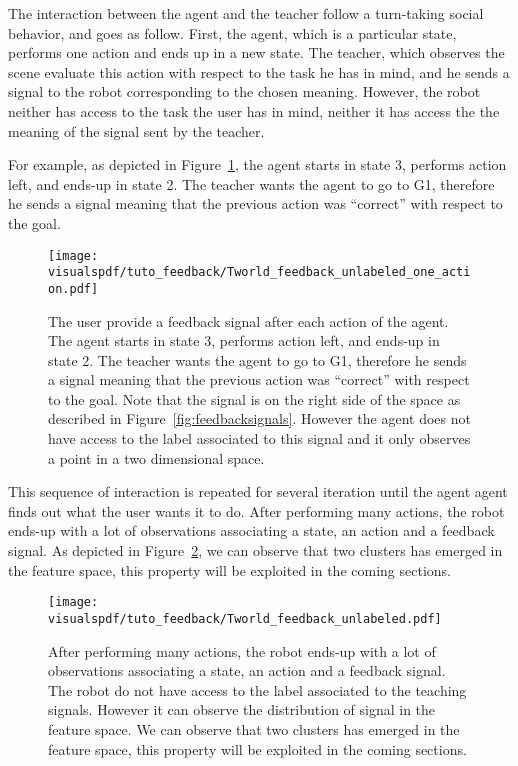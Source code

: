 The interaction between the agent and the teacher follow a turn-taking social behavior, and goes as follow. First, the agent, which is a particular state, performs one action and ends up in a new state. The teacher, which observes the scene evaluate this action with respect to the task he has in mind, and he sends a signal to the robot corresponding to the chosen meaning. However, the robot neither has access to the task the user has in mind, neither it has access the the meaning of the signal sent by the teacher.

For example, as depicted in Figure~\ref{fig:TworldOneStepUnlabeled}, the agent starts in state 3, performs action left, and ends-up in state 2. The teacher wants the agent to go to G1, therefore he sends a signal meaning that the previous action was ``correct'' with respect to the goal.

\begin{figure}[!htbp]
  \centering
  \texttt{[image: \\visualspdf/tuto\_feedback/Tworld\_feedback\_unlabeled\_one\_action.pdf]}
  \caption{The user provide a feedback signal after each action of the agent. The agent starts in state 3, performs action left, and ends-up in state 2. The teacher wants the agent to go to G1, therefore he sends a signal meaning that the previous action was ``correct'' with respect to the goal. Note that the signal is on the right side of the space as described in Figure~\ref{fig:feedbacksignals}. However the agent does not have access to the label associated to this signal and it only observes a point in a two dimensional space.}
  \label{fig:TworldOneStepUnlabeled}
\end{figure}

This sequence of interaction is repeated for several iteration until the agent agent finds out what the user wants it to do. After performing many actions, the robot ends-up with a lot of observations associating a state, an action and a feedback signal. As depicted in Figure~\ref{fig:TworldManyStepUnlabeled}, we can observe that two clusters has emerged in the feature space, this property will be exploited in the coming sections.

\begin{figure}[!htbp]
  \centering
  \texttt{[image: \\visualspdf/tuto\_feedback/Tworld\_feedback\_unlabeled.pdf]}
  \caption{After performing many actions, the robot ends-up with a lot of observations associating a state, an action and a feedback signal. The robot do not have access to the label associated to the teaching signals. However it can observe the distribution of signal in the feature space. We can observe that two clusters has emerged in the feature space, this property will be exploited in the coming sections.}
  \label{fig:TworldManyStepUnlabeled}
\end{figure}

